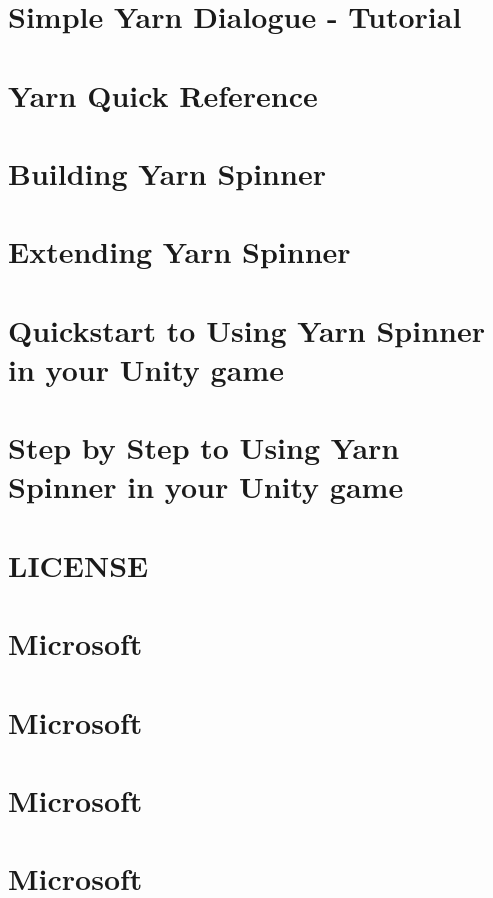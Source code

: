 \documentclass[twoside]{book}
\begin{document}
\chapter{Simple Yarn Dialogue -\/ Tutorial}
\label{a00014}
\hypertarget{a00014}{}

\chapter{Yarn Quick Reference}
\label{a00016}
\hypertarget{a00016}{}

\chapter{Building Yarn Spinner}
\label{a00018}
\hypertarget{a00018}{}

\chapter{Extending Yarn Spinner}
\label{a00020}
\hypertarget{a00020}{}

\chapter{Quickstart to Using Yarn Spinner in your Unity game}
\label{a00022}
\hypertarget{a00022}{}

\chapter{Step by Step to Using Yarn Spinner in your Unity game}
\label{a00024}
\hypertarget{a00024}{}

\chapter{L\-I\-C\-E\-N\-S\-E}
\label{a00026}
\hypertarget{a00026}{}

\chapter{Microsoft}
\label{a00028}
\hypertarget{a00028}{}

\chapter{Microsoft}
\label{a00030}
\hypertarget{a00030}{}

\chapter{Microsoft}
\label{a00032}
\hypertarget{a00032}{}

\chapter{Microsoft}
\label{a00034}
\hypertarget{a00034}{}

\end{document}
